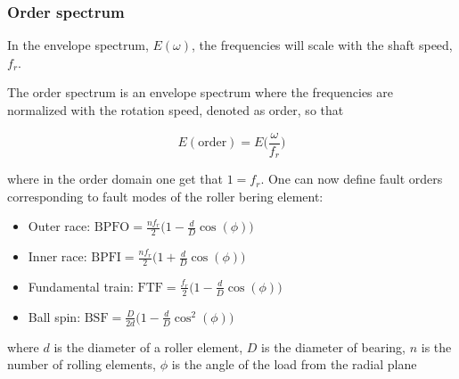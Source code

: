 \begin{frame}
    \frametitle{Order spectrum}
    \small
    
    In the envelope spectrum, $E(\omega)$, the frequencies will scale with the shaft speed, $f_r$.  
    
    The order spectrum is an envelope spectrum where the frequencies are normalized with the rotation speed, denoted as order, so that
    
    \begin{equation}
        E(\text{order}) = E\Big(\frac{\omega}{f_r}\Big)
    \end{equation}
    
    where in the order domain one get that $1 = f_r$. One can now define fault orders corresponding to fault modes of the roller bering element:
    
    \begin{itemize}
        \item Outer race: $\text{BPFO}=\frac{nf_r}{2} \big( 1 - \frac{d}{D} \cos(\phi) \big) $
        
        \item Inner race: $\text{BPFI}=\frac{nf_r}{2} \big( 1 + \frac{d}{D} \cos(\phi) \big) $
        
        \item Fundamental train: $\text{FTF}=\frac{f_r}{2} \big( 1 - \frac{d}{D} \cos(\phi) \big) $
        
        \item Ball spin: $\text{BSF}=\frac{D}{2d} \big( 1 - \frac{d}{D} \cos^2(\phi) \big) $
    \end{itemize}
    
    where $d$ is the diameter of a roller element, $D$ is the diameter of bearing, $n$ is the number of rolling elements, $\phi$ is the angle of the load from the radial plane
   
\end{frame}